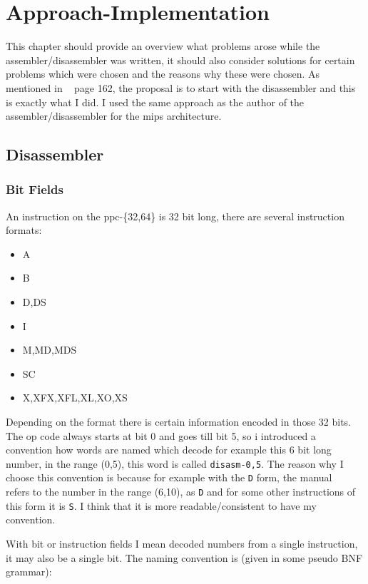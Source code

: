 \section{Approach-Implementation}

This chapter should provide an overview what problems arose while the
assembler/disassembler was written, it should also consider solutions for
certain problems which were chosen and the reasons why these were chosen.
As mentioned in ~\cite{gforthman} page 162, the proposal is to start with the 
disassembler and this is exactly what I did. I used the same approach as the 
author of the assembler/disassembler for the mips architecture.

    \subsection{Disassembler}

    \subsubsection{\label{cflags}Bit Fields}

    An instruction on the ppc-\{32,64\} is 32 bit long, there are several 
    instruction formats:

    \begin{itemize}
    \item A
    \item B
    \item D,DS
    \item I
    \item M,MD,MDS
    \item SC
    \item X,XFX,XFL,XL,XO,XS
    \end{itemize}

    Depending on the format there is certain information encoded in those 32
    bits. The op code always starts at bit 0 and goes till bit 5, so i introduced
    a convention how words are named which decode for example this 6 bit long
    number, in the range (0,5), this word is called \texttt{disasm-0,5}. The
    reason why I choose this convention is because for example with the
    \texttt{D} form, the manual ~\cite{ppcman} refers to the number in the 
    range (6,10), as \texttt{D} and for some other instructions of this form 
    it is \texttt{S}. I think that it is more readable/consistent to have my 
    convention.

    With bit or instruction fields I mean decoded numbers from a single 
    instruction, it may also be a single bit. The naming convention is
    (given in some pseudo BNF grammar):


